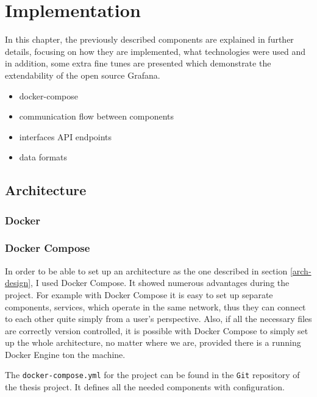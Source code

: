 \chapter{Implementation}

In this chapter, the previously described components are explained in further details, focusing on how they are implemented, what technologies were used and in addition, some extra fine tunes are presented which demonstrate the extendability of the open source Grafana.

\begin{center}
	\begin{itemize}
		\item docker-compose
		\item communication flow between components
		\item interfaces API endpoints
		\item data formats
	\end{itemize}
	
\end{center}

\section{Architecture}

\subsection{Docker}
\subsection{Docker Compose}

In order to be able to set up an architecture as the one described in section \ref{arch-design}, I used Docker Compose. It showed numerous advantages during the project. For example with Docker Compose it is easy to set up separate components, services, which operate in the same network, thus they can connect to each other quite simply from a user's perspective. Also, if all the necessary files are correctly version controlled, it is possible with Docker Compose to simply set up the whole architecture, no matter where we are, provided there is a running Docker Engine ton the machine.

The \texttt{docker-compose.yml} for the project can be found in the \texttt{Git} repository of the thesis project. It defines all the needed components with configuration.

